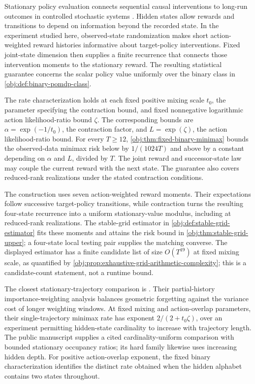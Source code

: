 \documentclass[11pt]{article}
\begin{document}
Stationary policy evaluation connects sequential causal interventions to long-run outcomes in controlled stochastic systems \citep{Robins1986,Murphy2003,Puterman1994}. Hidden states allow rewards and transitions to depend on information beyond the recorded state. In the experiment studied here, observed-state randomization makes short action-weighted reward histories informative about target-policy interventions. Fixed joint-state dimension then supplies a finite recurrence that connects those intervention moments to the stationary reward. The resulting statistical guarantee concerns the scalar policy value uniformly over the binary class in \cref{obj:def:binary-pomdp-class}.

The rate characterization holds at each fixed positive mixing scale \(t_0\), the parameter specifying the contraction bound, and fixed nonnegative logarithmic action likelihood-ratio bound \(\zeta\). The corresponding bounds are \(\alpha=\exp(-1/t_0)\), the contraction factor, and \(L=\exp(\zeta)\), the action likelihood-ratio bound. For every \(T\geq12\), \cref{obj:thm:fixed-binary-minimax} bounds the observed-data minimax risk below by \(1/(1024T)\) and above by a constant depending on \(\alpha\) and \(L\), divided by \(T\). The joint reward and successor-state law may couple the current reward with the next state. The guarantee also covers reduced-rank realizations under the stated contraction conditions.

The construction uses seven action-weighted reward moments. Their expectations follow successive target-policy transitions, while contraction turns the resulting four-state recurrence into a uniform stationary-value modulus, including at reduced-rank realizations. The stable-grid estimator in \cref{obj:def:stable-grid-estimator} fits these moments and attains the risk bound in \cref{obj:thm:stable-grid-upper}; a four-state local testing pair supplies the matching converse. The displayed estimator has a finite candidate list of size \(O(T^{19})\) at fixed mixing scale, as quantified by \cref{obj:prop:exhaustive-grid-arithmetic-complexity}; this is a candidate-count statement, not a runtime bound.

The closest stationary-trajectory comparison is \citet[Theorem 2.1, Corollary 2.2, and Theorem 3.1]{HuWager2023}. Their partial-history importance-weighting analysis balances geometric forgetting against the variance cost of longer weighting windows. At fixed mixing and action-overlap parameters, their single-trajectory minimax rate has exponent \(2/(2+t_0\zeta)\), over an experiment permitting hidden-state cardinality to increase with trajectory length. The public manuscript \citet[Theorem 1 (Uniform overlap frontier) and the Signed-depth family definition]{CausalSmithLatentOverlap2026} supplies a cited cardinality-uniform comparison with bounded stationary occupancy ratios; its hard family likewise uses increasing hidden depth. For positive action-overlap exponent, the fixed binary characterization identifies the distinct rate obtained when the hidden alphabet contains two states throughout.
\end{document}
